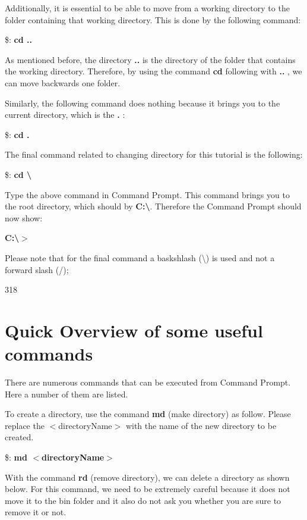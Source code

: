 \documentclass{article}
\begin{document}
	\par Additionally, it is essential to be able to move from a working directory to the folder containing that working directory. This is done by the following command:
	
	\par \$: \textbf{cd ..}
	
	\par As mentioned before, the directory \textbf{..} is the directory of the folder that contains the working directory. Therefore, by using the command \textbf{cd} following with \textbf{..} , we can move backwards one folder. 
	
	\par Similarly, the following command does nothing because it brings you to the current directory, which is the \textbf{.} :
	\par \$: \textbf{cd .}
	
	\par The final command related to changing directory for this tutorial is the following: 
	
	\par \$: \textbf{cd \textbackslash}
		
		\par Type the above command in Command Prompt. This command brings you to the root directory, which should by \textbf{C:\textbackslash}. Therefore the Command Prompt should now show:
		\par \textbf{C:\textbackslash $>$}
		\par Please note that for the final command a baskshlash (\textbackslash) is used and not a forward slash (/);
	
	318
	\section{Quick Overview of some useful commands}\label{sec:Commands}
	
	\par There are numerous commands that can be executed from Command Prompt. Here a number of them are listed.
	
	\par To create a directory, use the command \textbf{md} (make directory) as follow. Please replace the $<$directoryName$>$ with the name of the new directory to be created. 
	
	\par \$:\textbf{ md $<$directoryName$>$}
	
	With the command \textbf{rd} (remove directory), we can delete a directory as shown below. For this command, we need to be extremely careful because it does not move it to the bin folder and it also do not ask you whether you are sure to remove it or not. 
	
\end{document}
